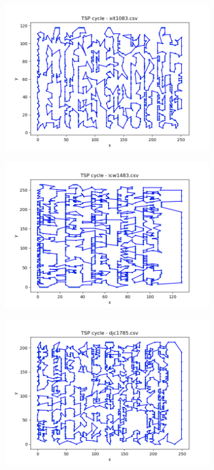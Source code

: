 \documentclass[12pt]{article}
\begin{document}
\begin{figure}[htpb]
\begin{subfigure}[b]{0.475\textwidth}
                \includegraphics[width=\linewidth]{img/xit1083.png}
            \end{subfigure}
            \hfill
            \begin{subfigure}[b]{0.475\textwidth}
                \includegraphics[width=\linewidth]{img/icw1483.png}
            \end{subfigure}
            \begin{subfigure}[b]{0.475\textwidth}
                \includegraphics[width=\linewidth]{img/djc1785.png}

\end{subfigure}
\end{figure}
\end{document}
